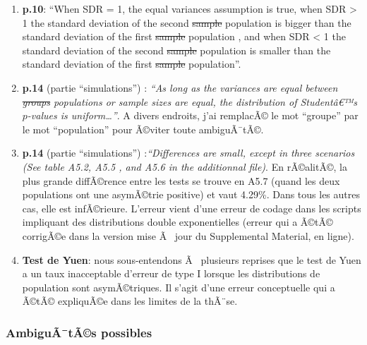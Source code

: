 \begin{appendix}
\begin{enumerate}
\def\labelenumi{\arabic{enumi})}
\setcounter{enumi}{1}
\item
  \color{black}\textbf{p.10}: ``When SDR = 1, the equal variances
  assumption is true, when SDR \textgreater{} 1 the standard deviation
  of the second \sout{sample} \color{blue} population \color{black} is
  bigger than the standard deviation of the first \sout{sample}
  \color{blue} population \color{black}, and when SDR \textless{} 1 the
  standard deviation of the second \sout{sample} \color{blue}population
  \color{black} is smaller than the standard deviation of the first
  \sout{sample} \color{blue} population''. \color{black}
\item
  \textbf{p.14} (partie ``simulations'') : \emph{``As long as the
  variances are equal between \sout{groups} \color{blue} populations
  \color{black} or sample sizes are equal, the distribution of
  Studentâ€™s \(p\)-values is uniform\ldots{}''}. A divers endroits,
  j'ai remplacÃ© le mot ``groupe'' par le mot ``population'' pour
  Ã©viter toute ambiguÃ¯tÃ©.
\item
  \textbf{p.14} (partie ``simulations'') :\emph{``Differences are small,
  except in three scenarios (See table A5.2, A5.5 , and A5.6 in the
  additionnal file)}. En rÃ©alitÃ©, la plus grande diffÃ©rence entre les
  tests se trouve en A5.7 (quand les deux populations ont une asymÃ©trie
  positive) et vaut 4.29\%. Dans tous les autres cas, elle est
  infÃ©rieure. L'erreur vient d'une erreur de codage dans les scripts
  impliquant des distributions double exponentielles (erreur qui a Ã©tÃ©
  corrigÃ©e dans la version mise Ã~ jour du Supplemental Material, en
  ligne).
\item
  \textbf{Test de Yuen}: nous sous-entendons Ã~ plusieurs reprises que
  le test de Yuen a un taux inacceptable d'erreur de type I lorsque les
  distributions de population sont asymÃ©triques. Il s'agit d'une erreur
  conceptuelle qui a Ã©tÃ© expliquÃ©e dans les limites de la thÃ¨se.
\end{enumerate}

\hypertarget{ambiguuxe3tuxe3s-possibles}{%
\subsubsection{AmbiguÃ¯tÃ©s
possibles}\label{ambiguuxe3tuxe3s-possibles}}


\end{appendix}
